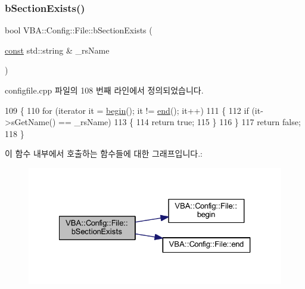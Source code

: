 \subsubsection{\texorpdfstring{b\+Section\+Exists()}{bSectionExists()}}
{\footnotesize\ttfamily bool V\+B\+A\+::\+Config\+::\+File\+::b\+Section\+Exists (\begin{DoxyParamCaption}\item[{\mbox{\hyperlink{getopt1_8c_a2c212835823e3c54a8ab6d95c652660e}{const}} std\+::string \&}]{\+\_\+rs\+Name }\end{DoxyParamCaption})}



configfile.\+cpp 파일의 108 번째 라인에서 정의되었습니다.


\begin{DoxyCode}
109 \{
110   \textcolor{keywordflow}{for} (iterator it = \mbox{\hyperlink{class_v_b_a_1_1_config_1_1_file_a4dd88e6aa71829ce332139028225efcf}{begin}}(); it != \mbox{\hyperlink{class_v_b_a_1_1_config_1_1_file_a809724e386bf59c8726c33e822890c70}{end}}(); it++)
111   \{
112     \textcolor{keywordflow}{if} (it->sGetName() == \_rsName)
113     \{
114       \textcolor{keywordflow}{return} \textcolor{keyword}{true};
115     \}
116   \}
117   \textcolor{keywordflow}{return} \textcolor{keyword}{false};
118 \}
\end{DoxyCode}
이 함수 내부에서 호출하는 함수들에 대한 그래프입니다.\+:
\nopagebreak
\begin{figure}[H]
\begin{center}
\leavevmode
\includegraphics[width=327pt]{class_v_b_a_1_1_config_1_1_file_a1c449716812ae76ece9dd315a89da8ff_cgraph}
\end{center}
\end{figure}
\mbox{\label{class_v_b_a_1_1_config_1_1_file_a809724e386bf59c8726c33e822890c70}} 
